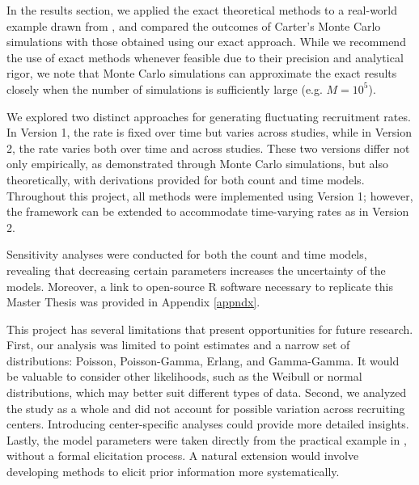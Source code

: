 In the results section, we applied the exact theoretical methods to a real-world example drawn from \cite{carter2004application}, and compared the outcomes of Carter's Monte Carlo simulations with those obtained using our exact approach. While we recommend the use of exact methods whenever feasible due to their precision and analytical rigor, we note that Monte Carlo simulations can approximate the exact results closely when the number of simulations is sufficiently large (e.g. $M=10^5$).

We explored two distinct approaches for generating fluctuating recruitment rates. In Version 1, the rate is fixed over time but varies across studies, while in Version 2, the rate varies both over time and across studies. These two versions differ not only empirically, as demonstrated through Monte Carlo simulations, but also theoretically, with derivations provided for both count and time models. Throughout this project, all methods were implemented using Version 1; however, the framework can be extended to accommodate time-varying rates as in Version 2. 

Sensitivity analyses were conducted for both the count and time models, revealing that decreasing certain parameters increases the uncertainty of the models. Moreover, a link to open-source R software necessary to replicate this Master Thesis was provided in Appendix \ref{appndx}.

This project has several limitations that present opportunities for future research. First, our analysis was limited to point estimates and a narrow set of distributions: Poisson, Poisson-Gamma, Erlang, and Gamma-Gamma. It would be valuable to consider other likelihoods, such as the Weibull or normal distributions, which may better suit different types of data. Second, we analyzed the study as a whole and did not account for possible variation across recruiting centers. Introducing center-specific analyses could provide more detailed insights. Lastly, the model parameters were taken directly from the practical example in \cite{carter2004application}, without a formal elicitation process. A natural extension would involve developing methods to elicit prior information more systematically.



